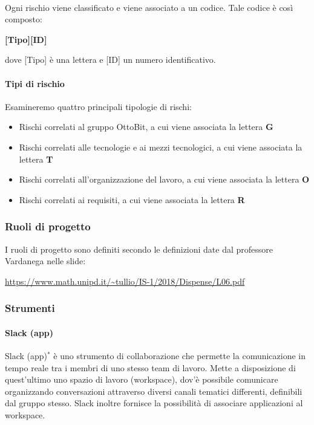 \documentclass[11pt,a4paper]{article}
\begin{document}
{	
	
	\noindent \\
	Ogni rischio viene classificato e viene associato a un codice. Tale codice è così composto:
	\begin{center}
		\textbf{[Tipo][ID]}
	\end{center}
	dove [Tipo] è una lettera e [ID] un numero identificativo.\\
	
	\paragraph{Tipi di rischio\\}
	Esamineremo quattro principali tipologie di rischi:
	
	\begin{itemize}
		\item Rischi correlati al gruppo OttoBit, a cui viene associata la lettera \textbf{G}
		\item Rischi correlati alle tecnologie e ai mezzi tecnologici, a cui viene associata la lettera \textbf{T}
		\item Rischi correlati all'organizzazione del lavoro, a cui viene associata la lettera \textbf{O}
		\item Rischi correlati ai requisiti, a cui viene associata la lettera \textbf{R}
	\end{itemize}
	
	\subsubsection{Ruoli di progetto}
	I ruoli di progetto sono definiti secondo le definizioni date dal professore Vardanega nelle slide:
	\begin{center}
		\url{https://www.math.unipd.it/~tullio/IS-1/2018/Dispense/L06.pdf}
	\end{center}
	\subsubsection{Strumenti}
	
	\paragraph{Slack (app)\\}
	Slack (app)$^*$ è uno strumento di collaborazione che permette la comunicazione in tempo reale tra i membri di uno stesso team di lavoro. Mette a disposizione di quest’ultimo uno spazio di lavoro (workspace), dov'è possibile comunicare organizzando conversazioni attraverso diversi canali tematici differenti, definibili dal gruppo stesso.
	Slack inoltre fornisce la possibilità di associare applicazioni al workspace.
	
}
\end{document}
